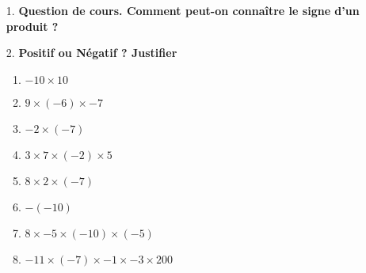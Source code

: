 \documentclass[11pt]{article}
\newcommand{\Pointilles}[1][3]{%
  \multido{}{#1}{\makebox[\linewidth]{\dotfill}\\[\parskip]
}}
\begin{document}
\begin{enumerate}
    \item[1.] \textbf{Question de cours. Comment peut-on connaître le signe d'un produit ?} \\
    \Pointilles[3]

    \item[2.] \textbf{Positif ou Négatif ? Justifier} 
    \begin{enumerate}
        \item $-10 \times 10$ \dotfill
        \item $9 \times (-6) \times -7$ \dotfill
        \item $-2 \times (-7)$ \dotfill
        \item $3 \times 7 \times (-2) \times 5$ \dotfill
        \item $8 \times 2 \times (-7)$ \dotfill
        \item $ -(-10)$ \dotfill
        \item $8 \times -5 \times (-10) \times (-5)$ \dotfill
        \item $-11 \times (-7) \times -1 \times -3 \times 200$ \dotfill
    \end{enumerate}
\end{enumerate}
\end{document}
